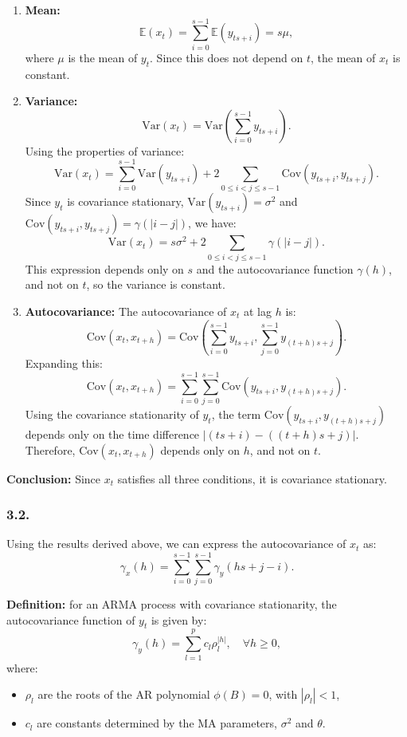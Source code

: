\documentclass{article}
\begin{document}
\begin{enumerate}

\item \textbf{Mean:}  
\[
\mathbb{E}(x_t) = \sum_{i=0}^{s-1} \mathbb{E}(y_{ts+i}) = s\mu,
\]
where \( \mu \) is the mean of \( y_t \). Since this does not depend on \( t \), the mean of \( x_t \) is constant.

\item \textbf{Variance:}  
\[
\text{Var}(x_t) = \text{Var}\left(\sum_{i=0}^{s-1} y_{ts+i}\right).
\]
Using the properties of variance:
\[
\text{Var}(x_t) = \sum_{i=0}^{s-1} \text{Var}(y_{ts+i}) + 2 \sum_{0 \leq i < j \leq s-1} \text{Cov}(y_{ts+i}, y_{ts+j}).
\]
Since \( y_t \) is covariance stationary, \( \text{Var}(y_{ts+i}) = \sigma^2 \) and \( \text{Cov}(y_{ts+i}, y_{ts+j}) = \gamma(|i-j|) \), we have:
\[
\text{Var}(x_t) = s\sigma^2 + 2 \sum_{0 \leq i < j \leq s-1} \gamma(|i-j|).
\]
This expression depends only on \( s \) and the autocovariance function \( \gamma(h) \), and not on \( t \), so the variance is constant.

\item \textbf{Autocovariance:}  
The autocovariance of \( x_t \) at lag \( h \) is:
\[
\text{Cov}(x_t, x_{t+h}) = \text{Cov}\left(\sum_{i=0}^{s-1} y_{ts+i}, \sum_{j=0}^{s-1} y_{(t+h)s+j}\right).
\]
Expanding this:
\[
\text{Cov}(x_t, x_{t+h}) = \sum_{i=0}^{s-1} \sum_{j=0}^{s-1} \text{Cov}(y_{ts+i}, y_{(t+h)s+j}).
\]
Using the covariance stationarity of \( y_t \), the term \( \text{Cov}(y_{ts+i}, y_{(t+h)s+j}) \) depends only on the time difference \( |(ts+i) - ((t+h)s+j)| \). Therefore, \( \text{Cov}(x_t, x_{t+h}) \) depends only on \( h \), and not on \( t \).

\end{enumerate}

\textbf{Conclusion:} Since \( x_t \) satisfies all three conditions, it is covariance stationary.

\subsubsection*{3.2.}

Using the results derived above, we can express the autocovariance of \( x_t \) as:
\[
\gamma_x(h) = \sum_{i=0}^{s-1}\sum_{j=0}^{s-1} \gamma_y(hs + j - i).
\]

\textbf{Definition:} for an ARMA process with covariance stationarity, the autocovariance function of \( y_t \) is given by:
\[
\gamma_y(h) = \sum_{l=1}^p c_l \rho_l^{|h|}, \quad \forall h \geq 0,
\]
where:
\begin{itemize}
  \item \( \rho_l \) are the roots of the AR polynomial \( \phi(B) = 0 \), with \( |\rho_l| < 1 \),
  \item \( c_l \) are constants determined by the MA parameters, $\sigma^{2}$ and $\theta$.
\end{itemize}
\end{document}

